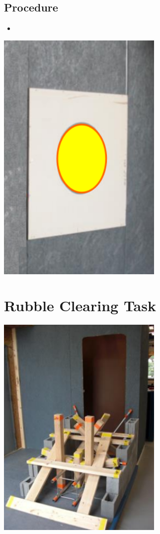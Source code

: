 \documentclass[letterpaper, 10 pt]{report}
\begin{document}
\subsection*{Procedure}
\begin{itemize}
\item 
\end{itemize}
\begin{center}
\includegraphics[width=8.0cm]{resources/wall-drilling}
\end{center}

\newpage
\section*{Rubble Clearing Task}
\includegraphics[width=8.0cm]{resources/rubble-clearing}
\end{document}
